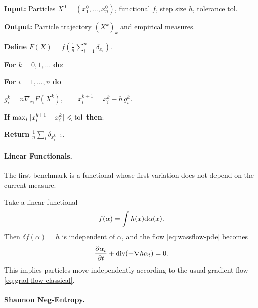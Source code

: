 \begin{alg}\label{alg:empirical-wasserstein-particle-flow}
\textbf{Input:} Particles $X^0=(x_1^0,\ldots,x_n^0)$, functional $f$, step size $h$, tolerance $\mathrm{tol}$.

\textbf{Output:} Particle trajectory $(X^k)_k$ and empirical measures.

\textbf{Define}
\(F(X)=f\!\left(\frac1n\sum_{i=1}^n\delta_{x_i}\right).\)

\textbf{For} $k=0,1,\ldots$ \textbf{do}:
\begin{algblock}

\textbf{For} $i=1,\ldots,n$ \textbf{do}
\begin{algblock}
\(g_i^k=n\nabla_{x_i}F(X^k), \qquad x_i^{k+1}=x_i^k-h\,g_i^k.\)
\end{algblock}
\textbf{If} \(\max_i|\!| x_i^{k+1}-x_i^k |\!|\leqslant \mathrm{tol}\) \textbf{then}:
\begin{algblock}
\textbf{Return} $\frac1n\sum_i\delta_{x_i^{k+1}}$.
\end{algblock}
\end{algblock}
\end{alg}

\paragraph{Linear Functionals.}

The first benchmark is a functional whose first variation does not depend on the current measure.

\begin{example}
Take a linear functional
   \begin{equation}\label{eq:linear-func}
       f(\alpha) = \int h(x) \mathrm{d} \alpha(x).
   \end{equation}
   Then $\delta f(\alpha) = h$ is independent of $\alpha$, and the flow \eqref{eq:wassflow-pde} becomes
   \begin{equation*}
       \frac{\partial \alpha_t}{\partial t} + \operatorname{div}(-\nabla h \alpha_t) = 0.
   \end{equation*}
   This implies particles move independently according to the usual gradient flow \eqref{eq:grad-flow-classical}.
\end{example}

\paragraph{Shannon Neg-Entropy.}


